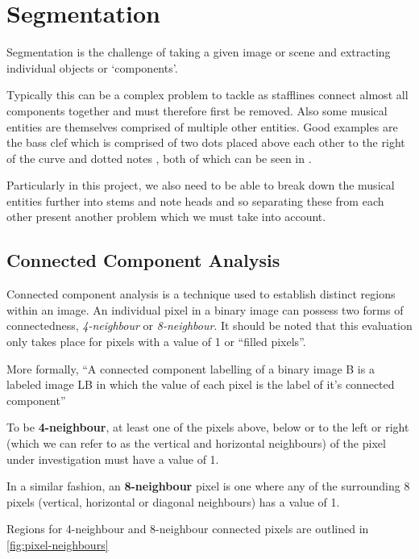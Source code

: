 \section{Segmentation}

Segmentation is the challenge of taking a given image or scene and extracting individual objects or `components'.

Typically this can be a complex problem to tackle as stafflines connect almost all components together and must therefore first be removed. Also some musical entities are themselves comprised of multiple other entities. Good examples are the bass clef which is comprised of two dots placed above each other to the right of the curve and dotted notes , both of which can be seen in .

Particularly in this project, we also need to be able to break down the musical entities further into stems and note heads and so separating these from each other present another problem which we must take into account.

\subsection{Connected Component Analysis}

Connected component analysis is a technique used to establish distinct regions within an image. An individual pixel in a binary image can possess two forms of connectedness, \emph{4-neighbour} or \emph{8-neighbour}. It should be noted that this evaluation only takes place for pixels with a value of 1 or ``filled pixels''.

More formally, ``A connected component labelling of a binary image B is a labeled image LB in which the value of each pixel is the label of it's connected component'' \parencite[pg 69]{shapiro2001computer}

To be \textbf{4-neighbour}, at least one of the pixels above, below or to the left or right (which we can refer to as the vertical and horizontal neighbours) of the pixel under investigation must have a value of 1.

In a similar fashion, an \textbf{8-neighbour} pixel is one where any of the surrounding 8 pixels (vertical, horizontal or diagonal neighbours) has a value of 1.

Regions for 4-neighbour and 8-neighbour connected pixels are outlined in \cref{fig:pixel-neighbours}

